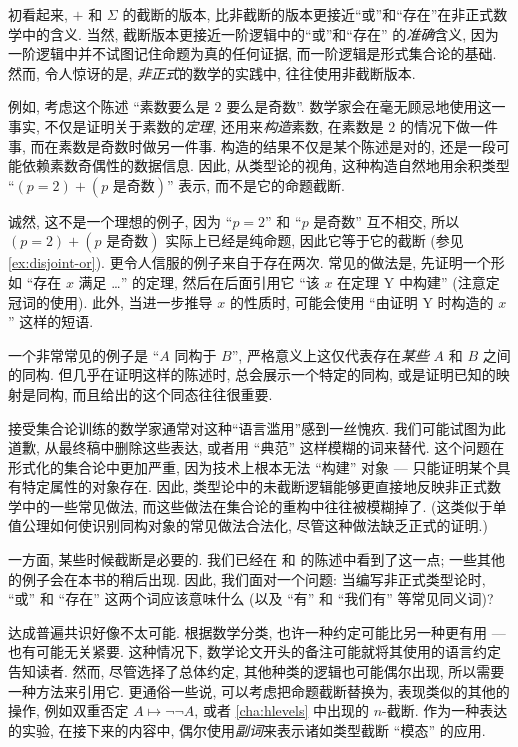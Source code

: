 %
%
%

初看起来, $+$ 和 $\Sigma$ 的截断的版本, 比非截断的版本更接近``或''和``存在''在非正式数学中的含义.
当然, 截断版本更接近一阶逻辑中的``或''和``存在'' 的\emph{准确}含义, 因为一阶逻辑中并不试图记住命题为真的任何证据, 而一阶逻辑是形式集合论的基础.
然而, 令人惊讶的是, \emph{非正式}的数学的实践中, 往往使用非截断版本.

%
例如, 考虑这个陈述 ``素数要么是 $2$ 要么是奇数''.
数学家会在毫无顾忌地使用这一事实, 不仅是证明关于素数的\emph{定理}, 还用来\emph{构造}素数, 在素数是 $2$ 的情况下做一件事, 而在素数是奇数时做另一件事.
构造的结果不仅是某个陈述是对的, 还是一段可能依赖素数奇偶性的数据信息.
因此, 从类型论的视角, 这种构造自然地用余积类型 ``$(p=2)+(p\text{ 是奇数})$'' 表示, 而不是它的命题截断.

诚然, 这不是一个理想的例子, 因为 ``$p=2$'' 和 ``$p$ 是奇数'' 互不相交, 所以 $(p=2)+(p\text{ 是奇数})$ 实际上已经是纯命题, 因此它等于它的截断 (参见 \cref{ex:disjoint-or}).
更令人信服的例子来自于存在两次.
常见的做法是, 先证明一个形如 ``存在 $x$ 满足 \dots'' 的定理, 然后在后面引用它 ``该 $x$ 在定理 Y 中构建'' (注意定冠词的使用).
此外, 当进一步推导 $x$ 的性质时, 可能会使用 ``由证明 Y 时构造的 $x$'' 这样的短语.

一个非常常见的例子是 ``$A$ 同构于 $B$'', 严格意义上这仅代表存在\emph{某些} $A$ 和 $B$ 之间的同构.
但几乎在证明这样的陈述时, 总会展示一个特定的同构, 或是证明已知的映射是同构, 而且给出的这个同态往往很重要.

接受集合论训练的数学家通常对这种``语言滥用''感到一丝愧疚.
我们可能试图为此道歉, 从最终稿中删除这些表达, 或者用 ``典范'' 这样模糊的词来替代.
这个问题在形式化的集合论中更加严重, 因为技术上根本无法 ``构建'' 对象 --- 只能证明某个具有特定属性的对象存在.
因此, 类型论中的未截断逻辑能够更直接地反映非正式数学中的一些常见做法, 而这些做法在集合论的重构中往往被模糊掉了.
(这类似于单值公理如何使识别同构对象的常见做法合法化, 尽管这种做法缺乏正式的证明.)

一方面, 某些时候截断是必要的.
我们已经在 \LEM{} 和 \choice{} 的陈述中看到了这一点;
一些其他的例子会在本书的稍后出现.
因此, 我们面对一个问题: 当编写非正式类型论时, ``或'' 和 ``存在'' 这两个词应该意味什么 (以及 ``有'' 和 ``我们有'' 等常见同义词)?

达成普遍共识好像不太可能.
根据数学分类, 也许一种约定可能比另一种更有用 --- 也有可能无关紧要.
这种情况下, 数学论文开头的备注可能就将其使用的语言约定告知读者.
然而, 尽管选择了总体约定, 其他种类的逻辑也可能偶尔出现, 所以需要一种方法来引用它.
更通俗一些说, 可以考虑把命题截断替换为, 表现类似的其他的操作, 例如双重否定 $A\mapsto \neg\neg A$, 或者 \cref{cha:hlevels} 中出现的 $n$-截断.
作为一种表达的实验, 在接下来的内容中, 偶尔使用\emph{副词}来表示诸如类型截断 ``模态'' 的应用.

